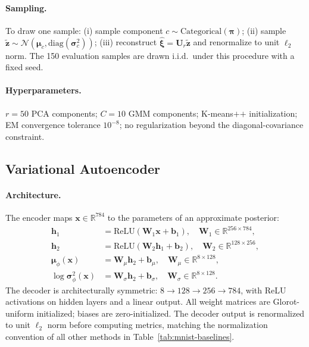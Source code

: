 \paragraph{Sampling.}
To draw one sample: (i) sample component $c\sim\mathrm{Categorical}(\boldsymbol{\pi})$;
(ii) sample $\tilde{\mathbf{z}}\sim\mathcal{N}(\boldsymbol{\mu}_c,\mathrm{diag}(\boldsymbol{\sigma}_c^2))$;
(iii) reconstruct $\hat{\boldsymbol{\xi}}=\mathbf{U}_{r}\tilde{\mathbf{z}}$ and
renormalize to unit $\ell_2$ norm.
The 150 evaluation samples are drawn i.i.d.\ under this procedure with a fixed seed.

\paragraph{Hyperparameters.}
$r{=}50$ PCA components; $C{=}10$ GMM components; K-means$\texttt{++}$ initialization;
EM convergence tolerance $10^{-8}$; no regularization beyond the diagonal-covariance constraint.

\subsection{Variational Autoencoder}\label{app:vae}

\paragraph{Architecture.}
The encoder maps $\mathbf{x}\in\mathbb{R}^{784}$ to the parameters of an approximate posterior:
\begin{align}
  \mathbf{h}_1 &= \mathrm{ReLU}(\mathbf{W}_1\mathbf{x}+\mathbf{b}_1),\quad
    \mathbf{W}_1\in\mathbb{R}^{256\times 784}, \\
  \mathbf{h}_2 &= \mathrm{ReLU}(\mathbf{W}_2\mathbf{h}_1+\mathbf{b}_2),\quad
    \mathbf{W}_2\in\mathbb{R}^{128\times 256}, \\
  \boldsymbol{\mu}_\phi(\mathbf{x}) &= \mathbf{W}_\mu\mathbf{h}_2+\mathbf{b}_\mu,\quad
    \mathbf{W}_\mu\in\mathbb{R}^{8\times 128}, \\
  \log\boldsymbol{\sigma}^2_\phi(\mathbf{x}) &= \mathbf{W}_\sigma\mathbf{h}_2+\mathbf{b}_\sigma,\quad
    \mathbf{W}_\sigma\in\mathbb{R}^{8\times 128}.
\end{align}
The decoder is architecturally symmetric: $8\to128\to256\to784$, with ReLU activations on
hidden layers and a linear output.
All weight matrices are Glorot-uniform initialized; biases are zero-initialized.
The decoder output is renormalized to unit $\ell_2$ norm before computing metrics, matching
the normalization convention of all other methods in Table~\ref{tab:mnist-baselines}.


